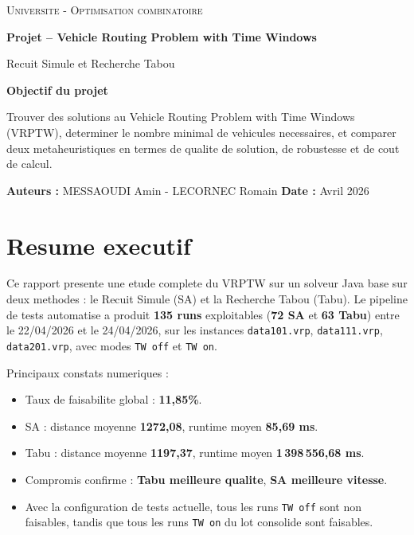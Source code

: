 \documentclass[12pt,a4paper]{report}
\begin{document}
\begin{titlepage}
  \centering
  {\scshape\LARGE Universite - Optimisation combinatoire \par}
  \vspace{1.2cm}
  {\huge\bfseries Projet – Vehicle Routing Problem with Time Windows\par}
  \vspace{0.5cm}
  {\Large Recuit Simule et Recherche Tabou\par}
  \vspace{1.8cm}

  \begin{minipage}{0.85\textwidth}
  \centering
  \textbf{Objectif du projet}\par
  Trouver des solutions au Vehicle Routing Problem with Time Windows (VRPTW),
  determiner le nombre minimal de vehicules necessaires,
  et comparer deux metaheuristiques en termes de qualite de solution,
  de robustesse et de cout de calcul.
  \end{minipage}

  \vfill
  \begin{flushleft}
  \textbf{Auteurs :} MESSAOUDI Amin - LECORNEC Romain
  \textbf{Date :} Avril 2026
  \end{flushleft}
\end{titlepage}

\tableofcontents
\listoffigures
\listoftables

\chapter*{Resume executif}
Ce rapport presente une etude complete du VRPTW sur un solveur Java base sur deux methodes :
le Recuit Simule (SA) et la Recherche Tabou (Tabu).
Le pipeline de tests automatise a produit \textbf{135 runs} exploitables
(\textbf{72 SA} et \textbf{63 Tabu}) entre le 22/04/2026 et le 24/04/2026,
sur les instances \texttt{data101.vrp}, \texttt{data111.vrp}, \texttt{data201.vrp},
avec modes \texttt{TW off} et \texttt{TW on}.

Principaux constats numeriques :
\begin{itemize}[leftmargin=1.2cm]
  \item Taux de faisabilite global : \textbf{11,85\%}.
  \item SA : distance moyenne \textbf{1272,08}, runtime moyen \textbf{85,69 ms}.
  \item Tabu : distance moyenne \textbf{1197,37}, runtime moyen \textbf{1\,398\,556,68 ms}.
  \item Compromis confirme : \textbf{Tabu meilleure qualite}, \textbf{SA meilleure vitesse}.
  \item Avec la configuration de tests actuelle, tous les runs \texttt{TW off} sont non faisables,
  tandis que tous les runs \texttt{TW on} du lot consolide sont faisables.
\end{itemize}
\end{document}
